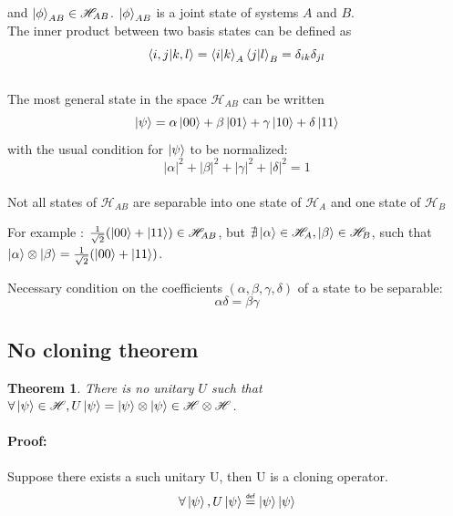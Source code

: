 \documentclass{article}
\newtheorem{theorem}{Theorem}
\newcommand\eqdef{\mathrel{\overset{\makebox[0pt]{\mbox{\normalfont\tiny\sffamily
def}}}{=}}}
\begin{document}
and $\ket{\phi}_{AB} \in \mathscr{H}_{AB}$. $\ket{\phi}_{AB}$ is a joint state
of systems $A$ and $B$. \\\noindent The inner product between two basis states
can be defined as
\begin{equation}
    \braket{i,j|k,l}=\braket{i|k}_A\braket{j|l}_B = \delta_{ik}\delta_{jl}
\end{equation}
\\\noindent The most general state in the space $\mathscr{H}_{AB}$ can be
written
\begin{equation}
    \ket{\psi} = \alpha \ket{00} + \beta \ket{01} + \gamma \ket{10} + \delta \ket{11}
\end{equation}
with the usual condition for $\ket{\psi}$ to be normalized:
\begin{equation}
    |\alpha|^2+|\beta|^2+|\gamma|^2+|\delta|^2 = 1
\end{equation}
\\\noindent Not all states of $\mathscr{H}_{AB}$ are separable into one state of
$\mathscr{H}_{A}$ and one state of $\mathscr{H}_{B}$

For example : $\frac{1}{\sqrt{2}}(\ket{00} + \ket{11}) \in \mathscr{H}_{AB}$,
but $\nexists \ket{\alpha}\in \mathscr{H}_A, \ket{\beta}\in \mathscr{H}_B$, such
that \\\noindent $\ket{\alpha}\otimes\ket{\beta} = \frac{1}{\sqrt{2}}(\ket{00} +
\ket{11})$.

Necessary condition on the coefficients $(\alpha, \beta, \gamma, \delta)$ of a
state to be separable:
\begin{equation}
    \alpha\delta = \beta\gamma
\end{equation}

\subsection{No cloning theorem}
\begin{theorem}
    There is no unitary $U$ such that $\forall \ket{\psi} \in \mathscr{H},
    U\ket{\psi} = \ket{\psi} \otimes \ket{\psi} \in \mathscr{H} \otimes
    \mathscr{H}$.
\end{theorem}
\paragraph{Proof: }
Suppose there exists a such unitary U, then U is a cloning operator.
\begin{equation}
    \begin{aligned}
        \forall \ket{\psi}, U\ket{\psi} \eqdef \ket{\psi}\ket{\psi}
    \end{aligned}
\end{equation}
\end{document}
